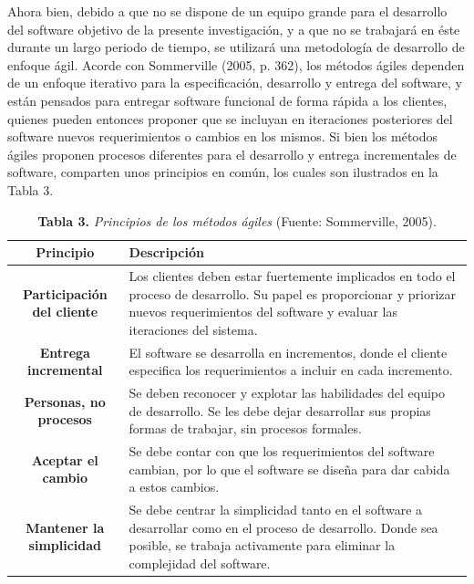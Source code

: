 Ahora bien, debido a que no se dispone de un equipo grande para el desarrollo del software objetivo de la presente investigaci\'{o}n, y a que no se trabajar\'{a} en \'{e}ste durante un largo periodo de tiempo, se utilizar\'{a} una metodolog\'{i}a de desarrollo de enfoque \'{a}gil. Acorde con Sommerville (2005, p. 362), los m\'{e}todos \'{a}giles dependen de un enfoque iterativo para la especificaci\'{o}n, desarrollo y entrega del software, y est\'{a}n pensados para entregar software funcional de forma r\'{a}pida a los clientes, quienes pueden entonces proponer que se incluyan en iteraciones posteriores del software nuevos requerimientos o cambios en los mismos. Si bien los m\'{e}todos \'{a}giles proponen procesos diferentes para el desarrollo y entrega incrementales de software, comparten unos principios en com\'{u}n, los cuales son ilustrados en la Tabla 3.

	\begin{table}[htb]
		\small
		\centering
		\setlength{\extrarowheight}{5pt}
		\begin{tabulary}{15cm}{|c|L|}
			\hline
			\textbf{Principio} & \textbf{Descripci\'{o}n}\\ \hline
			\textbf{Participaci\'{o}n del cliente} & Los clientes deben estar fuertemente implicados en todo el proceso de desarrollo. Su papel es proporcionar y priorizar nuevos requerimientos del software y evaluar las iteraciones del sistema.\\ \hline
			\textbf{Entrega incremental} & El software se desarrolla en incrementos, donde el cliente especifica los requerimientos a incluir en cada incremento.\\ \hline
			\textbf{Personas, no procesos} & Se deben reconocer y explotar las habilidades del equipo de desarrollo. Se les debe dejar desarrollar sus propias formas de trabajar, sin procesos formales.\\ \hline
			\textbf{Aceptar el cambio} & Se debe contar con que los requerimientos del software cambian, por lo que el software se dise\~{n}a para dar cabida a estos cambios.\\ \hline
			\textbf{Mantener la simplicidad} & Se debe centrar la simplicidad tanto en el software a desarrollar como en el proceso de desarrollo. Donde sea posible, se trabaja activamente para eliminar la complejidad del software.\\ \hline
		\end{tabulary}
		\caption{\textbf{Tabla 3.} \textit{Principios de los m\'{e}todos \'{a}giles} (Fuente: Sommerville, 2005).}
	\end{table}

